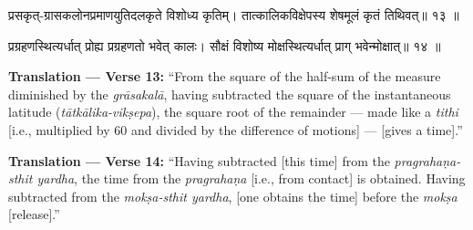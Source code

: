 \documentclass[11pt,a4paper]{article}
\newcommand{\dev}[1]{{\devanagarifont #1}}
\newenvironment{sanskritverse}{%
  \begin{center}\begin{minipage}{0.95\textwidth}
  \setlength{\leftskip}{1em}
  \setlength{\rightskip}{1em}
  \dev
}{\end{minipage}\end{center}}
\newenvironment{paracol}[1]{\begingroup}{\endgroup}
\newcommand{\switchcolumn}[1][]{%
  \ifnum#1=0\relax\else\par\nobreak\vspace{0.5em}\par\nobreak\fi%
}
\begin{document}
\begin{paracol}{2}

\begin{sanskritverse}
प्रसकृत्-ग्रासकलोनप्रमाणयुतिदलकृते विशोध्य कृतिम्।
तात्कालिकविक्षेपस्य शेषमूलं कृतं तिथिवत्॥ १३ ॥
\end{sanskritverse}

\begin{sanskritverse}
प्रग्रहणस्थित्यर्धात् प्रोह्य प्रग्रहणतो भवेत् कालः।
सौक्षं विशोष्य मोक्षस्थित्यर्धात् प्राग् भवेन्मोक्षात्॥ १४ ॥
\end{sanskritverse}

\switchcolumn

\textbf{Translation — Verse 13:} ``From the square of the half-sum of the measure diminished by the \textit{grāsakalā}, having subtracted the square of the instantaneous latitude (\textit{tātkālika-vikṣepa}), the square root of the remainder --- made like a \textit{tithi} [i.e., multiplied by 60 and divided by the difference of motions] --- [gives a time].''

\textbf{Translation — Verse 14:} ``Having subtracted [this time] from the \textit{pragrahaṇa-sthit yardha}, the time from the \textit{pragrahaṇa} [i.e., from contact] is obtained. Having subtracted from the \textit{mokṣa-sthit yardha}, [one obtains the time] before the \textit{mokṣa} [release].''

\end{paracol}

\vspace{0.5em}
\end{document}
